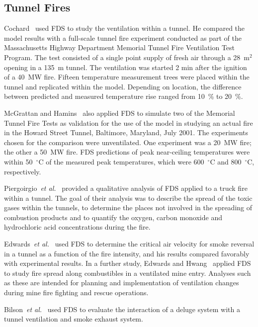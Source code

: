\subsection{Tunnel Fires}

Cochard~\cite{Cochard:1} used  FDS to  study the ventilation  within a tunnel. He  compared the model  results with a full-scale  tunnel fire
experiment conducted  as part of the  Massachusetts Highway Department Memorial Tunnel Fire Ventilation  Test Program.  The test consisted of a
single  point supply of  fresh air through  a 28~m$^2$ opening  in a 135~m tunnel.  The ventilation was started 2 min after the ignition of a  40~MW
fire.  Fifteen  temperature  measurement  trees were  placed within  the  tunnel and  replicated  within  the  model. Depending  on location,  the
difference between  predicted and  measured temperature rise ranged from 10~\% to 20~\%.

McGrattan and Hamins~\cite{McGrattan:HST} also applied FDS to simulate two of the Memorial Tunnel Fire Tests as validation for the use of the model
in  studying  an  actual  fire in  the  Howard  Street  Tunnel, Baltimore,  Maryland,  July  2001.  The  experiments  chosen  for  the comparison
were unventilated. One  experiment was  a 20~MW  fire; the other a 50~MW fire.  FDS predictions of peak near-ceiling temperatures were within
50~$^\circ$C of the measured peak temperatures, which were 600~$^\circ$C and 800~$^\circ$C, respectively.

Piergoirgio~{\em  et al.}~\cite{Piergiorgio:1} provided  a qualitative analysis of FDS applied to a  truck fire within a tunnel.  The goal of their
analysis  was to describe the  spread of the  toxic gases within the tunnels, to determine the  places not involved in the spreading of combustion
products  and to quantify  the oxygen, carbon  monoxide and hydrochloric acid concentrations during the fire.

Edwards~{\em  et al.}~\cite{Edwards:SME2005,Edwards:FSJ}  used  FDS to determine the critical air velocity  for smoke reversal in a tunnel as a
function of  the fire intensity, and his  results compared favorably with   experimental  results.   In  a   further  study,   Edwards  and
Hwang~\cite{Edwards:SME2006}  applied FDS to  study fire  spread along combustibles in  a ventilated mine  entry. Analyses such as  these are
intended for planning and implementation of ventilation changes during mine fire fighting and rescue operations.

Bilson~{\em et al.}~\cite{Bilson:2008} used FDS to evaluate the interaction of a deluge system with a tunnel
ventilation and smoke exhaust system.





